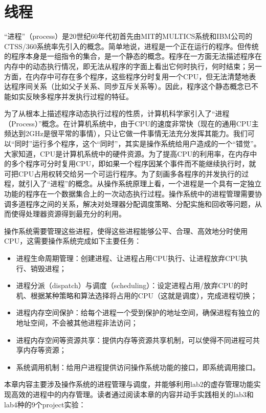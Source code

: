\chapter{线程}\label{ch_thread}

``进程''（process）是20世纪60年代初首先由MIT的MULTICS系统和IBM公司的CTSS/360系统率先引入的概念。简单地说，进程是一个正在运行的程序。但传统的程序本身是一组指令的集合，是一个静态的概念。程序在一方面无法描述程序在内存中的动态执行情况，即无法从程序的字面上看出它何时执行，何时结束；另一方面，在内存中可存在多个程序，这些程序分时复用一个CPU，但无法清楚地表达程序间关系（比如父子关系、同步互斥关系等）。因此，程序这个静态概念已不能如实反映多程序并发执行过程的特征。

为了从根本上描述程序动态执行过程的性质，计算机科学家引入了``进程（Process）''概念。在计算机系统中，由于CPU的速度非常快（现在的通用CPU主频达到2GHz是很平常的事情），只让它做一件事情无法充分发挥其能力。我们可以``同时''运行多个程序，这个``同时''，其实是操作系统给用户造成的一个``错觉''。大家知道，CPU是计算机系统中的硬件资源。为了提高CPU的利用率，在内存中的多个程序可分时复用CPU，即如果一个程序因某个事件而不能继续执行时，就可把CPU占用权转交给另一个可运行程序。为了刻画多各程序的并发执行的过程，就引入了``进程''的概念。从操作系统原理上看，一个进程是一个具有一定独立功能的程序在一个数据集合上的一次动态执行过程。操作系统中的进程管理需要协调多道程序之间的关系，解决对处理器分配调度策略、分配实施和回收等问题，从而使得处理器资源得到最充分的利用。

操作系统需要管理这些进程，使得这些进程能够公平、合理、高效地分时使用CPU，这需要操作系统完成如下主要任务：

\begin{itemize}
\item
  进程生命周期管理：创建进程、让进程占用CPU执行、让进程放弃CPU执行、销毁进程；
\item
  进程分派（dispatch）与调度（scheduling）：设定进程占用/放弃CPU的时机、根据某种策略和算法选择将占用的CPU（这就是调度），完成进程切换；
\item
  进程内存空间保护：给每个进程一个受到保护的地址空间，确保进程有独立的地址空间，不会被其他进程非法访问；
\item
  进程内存空间等资源共享：提供内存等资源共享机制，可以使得不同进程可共享内存等资源；
\item
  系统调用机制：给用户进程提供访问操作系统功能的接口，即系统调用接口。
\end{itemize}

本章内容主要涉及操作系统的进程管理与调度，并能够利用lab2的虚存管理功能实现高效的进程中的内存管理。读者通过阅读本章的内容并动手实践相关的lab3和lab4种的9个project实验：

